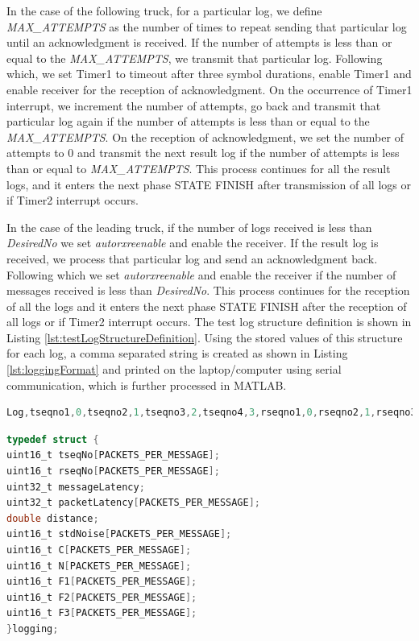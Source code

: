In the case of the following truck, for a particular log, we define \emph{MAX\_ATTEMPTS} as the number of times to repeat sending that particular log until an acknowledgment is received. If the number of attempts is less than or equal to the \emph{MAX\_ATTEMPTS}, we transmit that particular log. Following which, we set Timer1 to timeout after three symbol durations, enable Timer1 and enable receiver for the reception of acknowledgment. On the occurrence of Timer1 interrupt, we increment the number of attempts, go back and transmit that particular log again if the number of attempts is less than or equal to the \emph{MAX\_ATTEMPTS}. On the reception of acknowledgment, we set the number of attempts to 0 and transmit the next result log if the number of attempts is less than or equal to \emph{MAX\_ATTEMPTS}. This process continues for all the result logs, and it enters the next phase STATE FINISH after transmission of all logs or if Timer2 interrupt occurs.

In the case of the leading truck, if the number of logs received is less than \emph{DesiredNo} we set \emph{autorxreenable} and enable the receiver. If the result log is received, we process that particular log and send an acknowledgment back. Following which we set \emph{autorxreenable} and enable the receiver if the number of messages received is less than \emph{DesiredNo}. This process continues for the reception of all the logs and it enters the next phase STATE FINISH after the reception of all logs or if Timer2 interrupt occurs. The test log structure definition is shown in Listing \ref{lst:testLogStructureDefinition}. Using the stored values of this structure for each log, a comma separated string is created as shown in Listing \ref{lst:loggingFormat} and printed on the laptop/computer using serial communication, which is further processed in MATLAB.

\begin{lstlisting}[caption={Logging Format},
label={lst:loggingFormat}, language=C]
Log,tseqno1,0,tseqno2,1,tseqno3,2,tseqno4,3,rseqno1,0,rseqno2,1,rseqno3,2,rseqno4,3,messageLatency,8.950,packetLatency1,0.843,packetLatency2,0.843,packetLatency3,0.843,packetLatency4,0.829,distance,0.00,C1,955,C2,1015,C3,1028,C4,925,N1,236,N2,236,N3,235,N4,229,F11,2716,F12,2385,F13,2883,F14,2420,F21,3033,F22,3369,F23,3040,F24,3099,F31,2971,F32,2439,F33,2869,F34,2290
\end{lstlisting}

\vspace{2cm}
\begin{lstlisting}[caption={Test Log structure definition}, label={lst:testLogStructureDefinition}, language=C]
typedef struct {
uint16_t tseqNo[PACKETS_PER_MESSAGE];
uint16_t rseqNo[PACKETS_PER_MESSAGE];
uint32_t messageLatency;
uint32_t packetLatency[PACKETS_PER_MESSAGE];
double distance;
uint16_t stdNoise[PACKETS_PER_MESSAGE];
uint16_t C[PACKETS_PER_MESSAGE];
uint16_t N[PACKETS_PER_MESSAGE];
uint16_t F1[PACKETS_PER_MESSAGE];
uint16_t F2[PACKETS_PER_MESSAGE];
uint16_t F3[PACKETS_PER_MESSAGE];
}logging;
\end{lstlisting}





